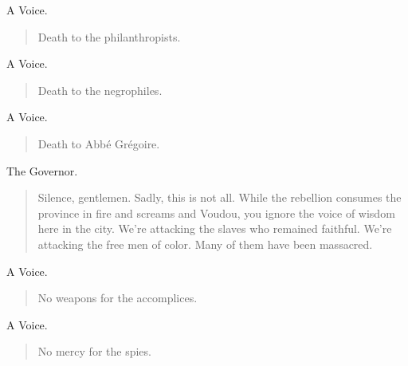 \documentclass[letterpaper,article,12pt,oneside,notitlepage]{memoir}
\begin{document}
\begin{center}A Voice.\end{center}

\begin{verse}
\hspace{1cm} Death to the philanthropists. \\
\end{verse}

\clearpage

\begin{center}A Voice.\end{center}

\begin{verse}
\hspace{1cm} Death to the negrophiles. \\
\end{verse}

\begin{center}A Voice.\end{center}

\begin{verse}
\hspace{1cm} Death to Abbé Grégoire. \\
\end{verse}

\begin{center}The Governor.\end{center}

\begin{verse}
\indent Silence, gentlemen. Sadly, this is not all. While the rebellion consumes the province in fire and screams and Voudou, you ignore the voice of wisdom here in the city. We're attacking the slaves who remained faithful. We're attacking the free men of color. Many of them have been massacred. \\
\end{verse}

\begin{center}A Voice.\end{center}

\begin{verse}
\hspace{1cm} No weapons for the accomplices. \\
\end{verse}

\begin{center}A Voice.\end{center}

\begin{verse}
\hspace{1cm} No mercy for the spies. \\
\end{verse}
\end{document}

